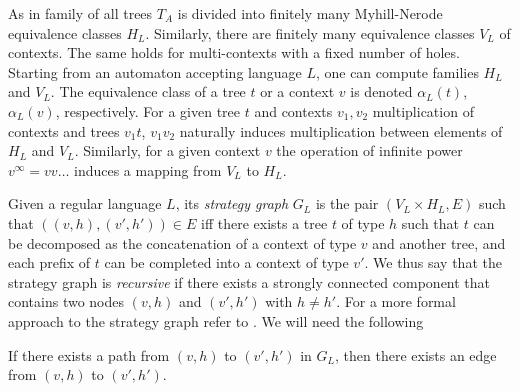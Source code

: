 As in \cite{bp} family of all trees $T_A$ is divided into finitely many Myhill-Nerode equivalence classes $H_L$. Similarly, there are finitely many equivalence classes $V_L$ of contexts. The same holds for multi-contexts with a fixed number of holes. Starting from an automaton accepting language $L$, one can compute families $H_L$ and $V_L$. The equivalence class of a tree $t$ or a context $v$ is denoted $\alpha_L(t)$, $\alpha_L(v)$, respectively. For a given tree $t$ and contexts $v_1,v_2$ multiplication of contexts and trees $v_1t$, $v_1v_2$ naturally induces multiplication between elements of $H_L$ and $V_L$. Similarly, for a given context $v$ the operation of infinite power $v^\infty = vv\ldots$ induces a mapping from $V_L$ to $H_L$. 

Given a regular language $L$, its \emph{strategy graph} $G_L$ is the pair $(V_L \times H_L, E)$ such that 
$((v,h),(v',h')) \in E$ iff there exists a tree $t$ of type
$h$ such that  $t$ can be decomposed as the concatenation of a context of type $v$ and another tree, and 
each prefix of $t$ can be completed into a context of type $v'$.
We thus say that the strategy graph is \emph{recursive} if there exists a strongly connected component that contains two nodes $(v, h)$ and $(v', h')$ with $h \neq h'$.
For a more formal approach to the strategy graph refer to \cite[Section G]{bp}. We will need the following 
\begin{proposition}[\cite{bp}]
\label{proposition:path to edge}
If there exists a path from $(v,h)$ to $(v',h')$ in $G_L$, then there exists an edge from $(v,h)$ to $(v',h')$.
\end{proposition}
